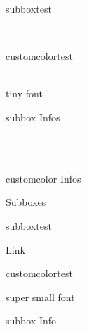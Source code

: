\documentclass[10pt,a4paper]{article}
\begin{document}
\begin{multicols}{3}
\begin{multibox}{2}
\begin{subbox}{subbox}{test}
			
			\\
			
		\end{subbox}
		\begin{subbox}{customcolor}{test}
			\scriptsize
			
			
			\\
			\tiny
			tiny font
			
		\end{subbox}
	\end{multibox}
	
	
	
	
	\begin{multibox}{2} %
		\begin{subbox}{subbox}{ Infos}
			
			\\
			\\
			
		\end{subbox}
		\begin{subbox}{customcolor}{ Infos}
			
		\end{subbox}
	\end{multibox}
	
	
	\begin{textbox}{Subboxes}
		\begin{multibox}{2} %
			\begin{subbox}{subbox}{test}
				
				\href{https://latex-ninja.com}{Link}
			\end{subbox}
			\begin{subbox}{customcolor}{test}
				\scriptsize
				
				
				\tiny
				super small font
				
			\end{subbox}
		\end{multibox}
		
		\begin{multibox}{2} %
			\begin{subbox}{subbox}{ Info}
				

\end{subbox}
\end{multibox}
\end{textbox}
\end{multicols}
\end{document}

